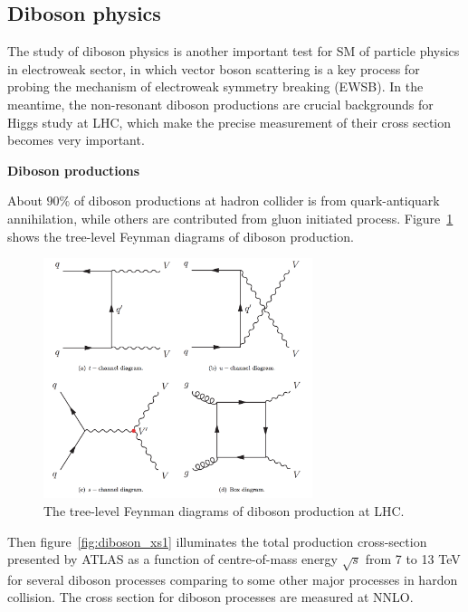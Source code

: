 \subsection{Diboson physics}
\label{diboson}

The study of diboson physics is another important test for SM of particle physics in electroweak sector, 
in which vector boson scattering is a key process for probing the mechanism of electroweak symmetry breaking (EWSB).
In the meantime, the non-resonant diboson productions are crucial backgrounds for Higgs study at LHC, which make the precise measurement of their cross section becomes very important.

\textbf{Diboson productions}

About $90\%$ of diboson productions at hadron collider is from quark-antiquark annihilation,
while others are contributed from gluon initiated process.
Figure~\ref{fig:diboson_fd1} shows the tree-level Feynman diagrams of diboson production.
\begin{figure}[!htb]
  \centering
  \includegraphics[width=0.7\textwidth]{figures/Theory/diboson_prod_fey.png}
  \caption{The tree-level Feynman diagrams of diboson production at LHC.}
  \label{fig:diboson_fd1}
\end{figure}
Then figure~\ref{fig:diboson_xs1} illuminates the total production cross-section presented by ATLAS
as a function of centre-of-mass energy $\sqrt{s}$ from 7 to 13 TeV for several diboson processes comparing 
to some other major processes in hardon collision.
The cross section for diboson processes are measured at NNLO. 
